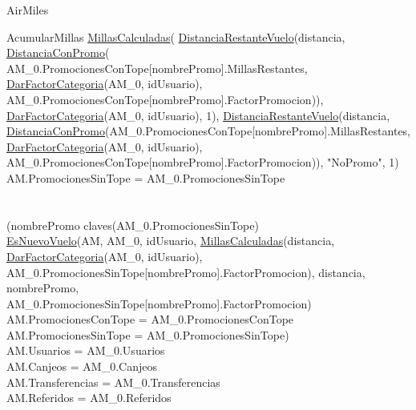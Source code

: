 \documentclass[11pt,a4paper]{article}
\begin{document}
\begin{tad}{AirMiles}
\begin{proc}{AcumularMillas}
{{{					\hyperref[sec:MillasCalculadas]{MillasCalculadas}(
					\hyperref[sec:DistanciaRestanteVuelo]{DistanciaRestanteVuelo}(distancia,
					\hyperref[sec:DistanciaConPromo]{DistanciaConPromo}( \\ AM_0.PromocionesConTope[nombrePromo].MillasRestantes, \\
					\hyperref[sec:DarFactorCategoria]{DarFactorCategoria}(AM_0, idUsuario), \\
					AM_0.PromocionesConTope[nombrePromo].FactorPromocion)), \\
					\hyperref[sec:DarFactorCategoria]{DarFactorCategoria}(AM_0, idUsuario), 1),
					\hyperref[sec:DistanciaRestanteVuelo]{DistanciaRestanteVuelo}(distancia, \\
					\hyperref[sec:DistanciaConPromo]{DistanciaConPromo}(AM_0.PromocionesConTope[nombrePromo].MillasRestantes, \\
					\hyperref[sec:DarFactorCategoria]{DarFactorCategoria}(AM_0, idUsuario), \\
					AM_0.PromocionesConTope[nombrePromo].FactorPromocion)),
					"NoPromo", 1) \land
					AM.PromocionesSinTope = AM_0.PromocionesSinTope
				}
			}{
				\\
				 \\
				\\
				(nombrePromo \in claves(AM_0.PromocionesSinTope) \implicaLuego
				\\
				\hyperref[sec:EsNuevoVuelo]{EsNuevoVuelo}(AM, AM_0, idUsuario,
				\hyperref[sec:MillasCalculadas]{MillasCalculadas}(distancia, \\ \hyperref[sec:DarFactorCategoria]{DarFactorCategoria}(AM_0, idUsuario), \\
				AM_0.PromocionesSinTope[nombrePromo].FactorPromocion), distancia,
				nombrePromo, \\ AM_0.PromocionesSinTope[nombrePromo].FactorPromocion) \land \\
				AM.PromocionesConTope = AM_0.PromocionesConTope \land \\
				AM.PromocionesSinTope = AM_0.PromocionesSinTope)
			} \land
			\\
			AM.Usuarios = AM_0.Usuarios \land \\
			AM.Canjeos = AM_0.Canjeos \land \\
			AM.Transferencias = AM_0.Transferencias \land \\
			AM.Referidos = AM_0.Referidos
		}
	\end{proc}


\end{tad}
\end{document}
